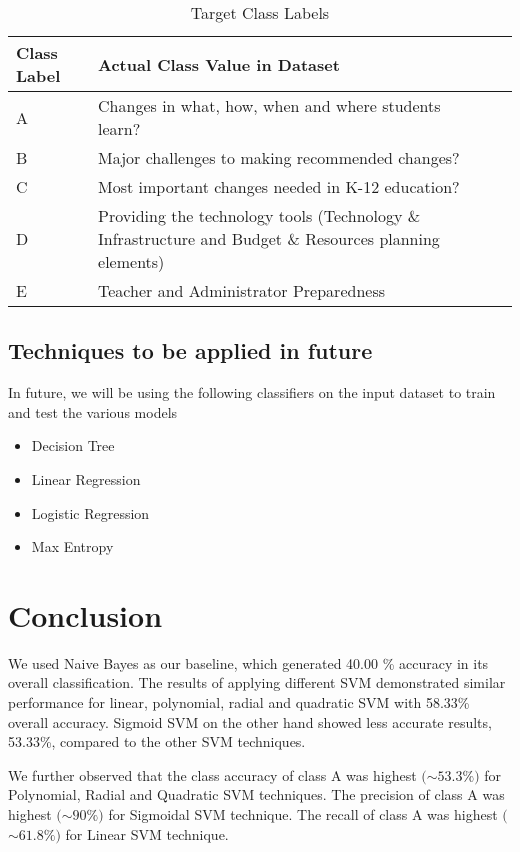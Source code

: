 \documentclass{article}
\begin{document}
\begin{table}[h!]
\caption{Target Class Labels}
  \label{table1}
  \centering
  \begin{tabular}{lll}
    \toprule
    \cmidrule{1-2}
    Class Label     & Actual Class Value in Dataset            \\
    \midrule
    A     & Changes in what, how, when and where students learn?      \\
    B      & Major challenges to making recommended changes?      \\
    C  & Most important changes needed in K-12 education?       \\
    D     & Providing the technology tools (Technology \& Infrastructure and Budget \& Resources planning elements)      \\
    E     & Teacher and Administrator Preparedness      \\
    \bottomrule
  \end{tabular}
\end{table}

\FloatBarrier
\subsection{Techniques to be applied in future}

In future, we will be using the following classifiers on the input dataset to train and test the various models

\begin{itemize}
\item Decision Tree
\item Linear Regression
\item Logistic Regression
\item Max Entropy
\end{itemize}



\section*{Conclusion}
We used Naive Bayes as our baseline, which generated 40.00 \% accuracy in its overall classification. The results of applying different SVM demonstrated similar performance for linear, polynomial, radial and quadratic SVM with 58.33\% overall accuracy. Sigmoid SVM on the other hand showed less accurate results, 53.33\%, compared to the other SVM techniques. 

We further observed that the class accuracy of class A was highest $($$\sim$$53.3\%$$)$ for Polynomial, Radial and Quadratic SVM techniques. The precision of class A was highest $($$\sim$$90\%$$)$ for Sigmoidal SVM technique. The recall of class A was highest $($$\sim$$61.8\%$$)$ for Linear SVM technique. 
\end{document}
